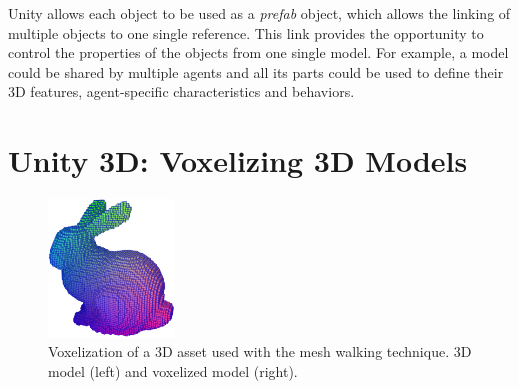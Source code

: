Unity allows each object to be used as a \textit{prefab} object, which allows the linking of multiple objects to one single reference. This link provides the opportunity to control the properties of the objects from one single model. For example, a model could be shared by multiple agents and all its parts could be used to define their 3D features, agent-specific characteristics and behaviors.




\newpage

\section{Unity 3D: Voxelizing 3D Models}\label{appendix:unity3d-voxelizing-3dmodels}




\begin{figure}[!ht]
        \centering
        \includegraphics[width=0.3\textwidth]{images/voxel_bunny_borders.png}
        \caption{Voxelization of a 3D asset used with the mesh walking technique. 3D model (left) and voxelized model (right). 
        }
        \label{fig:unity-voxelized}
\end{figure}


